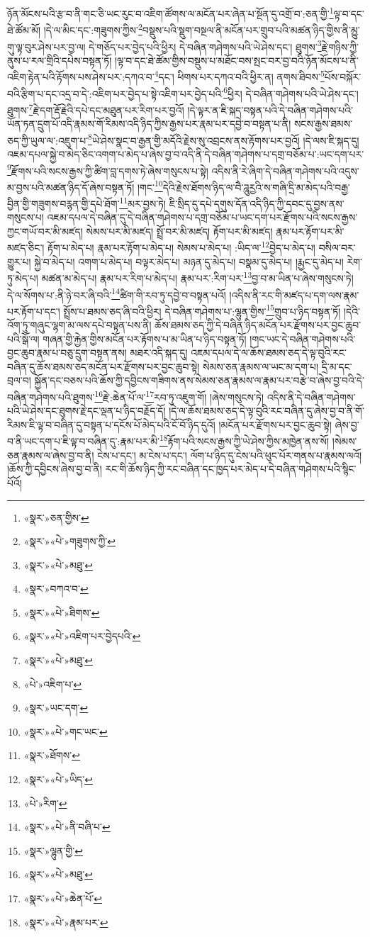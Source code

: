 ཉོན་མོངས་པའི་རྩ་བ་ནི་གང་ཅི་ཡང་རུང་བ་འཇིག་ཚོགས་ལ་མངོན་པར་ཞེན་པ་སྔོན་དུ་འགྲོ་བ་:ཅན་གྱི་\footnote{«སྣར་»ཅན་གྱིས་}ལྟ་བ་དང་ཐེ་ཚོམ་མོ། །དེ་ལ་མིང་དང་:གཟུགས་ཀྱིས་\footnote{«སྣར་»«པེ་»གཟུགས་ཀྱི་}བསྡུས་པའི་སྡུག་བསྔལ་ནི་མངོན་པར་གྲུབ་པའི་མཚན་ཉིད་གྱིས་ནི་མྱུ་གུ་ལྟ་བུར་ཤེས་པར་བྱ་ལ། དེ་གཅོད་པར་བྱེད་པའི་ཕྱིར། དེ་བཞིན་གཤེགས་པའི་ཡེ་ཤེས་དང་། ཐུགས་\footnote{«སྣར་»«པེ་»མཐུ་}རྗེ་གཉིས་ཀྱི་ནུས་པ་རལ་གྲིའི་དཔེས་བསྟན་ཏོ། །ལྟ་བ་དང་ཐེ་ཚོམ་གྱིས་བསྡུས་པ་མཐོང་བས་སྤང་བར་བྱ་བའི་ཉོན་མོངས་པ་ནི་འཇིག་རྟེན་པའི་རྟོགས་པས་ཤེས་པར་:དཀའ་བ་\footnote{«སྣར་»བཀའ་བ་}དང་། ཕིགས་པར་དཀའ་བའི་ཕྱིར་ན། ནགས་ཐིབས་\footnote{«སྣར་»«པེ་»ཐིགས་}པོས་བསྐོར་བའི་རྩིག་པ་དང་འདྲ་བ་དེ་:འཇིག་པར་བྱེད་པ་སྟེ་འཇིག་པར་བྱེད་པའི་\footnote{«སྣར་»«པེ་»འཇིག་པར་བྱེདཔའི་}ཕྱིར། དེ་བཞིན་གཤེགས་པའི་ཡེ་ཤེས་དང་། ཐུགས་\footnote{«སྣར་»«པེ་»མཐུ་}རྗེ་དག་རྡོ་རྗེའི་དཔེ་དང་མཐུན་པར་རིག་པར་བྱའོ། །དེ་ལྟར་ན་ཇི་སྐད་བསྟན་པའི་དེ་བཞིན་གཤེགས་པའི་ཡོན་ཏན་དྲུག་པོ་འདི་རྣམས་གོ་རིམས་འདི་ཉིད་ཀྱིས་རྒྱས་པར་རྣམ་པར་དབྱེ་བ་བསྟན་པ་ནི། སངས་རྒྱས་ཐམས་ཅད་ཀྱི་ཡུལ་ལ་:འཇུག་པ་\footnote{«པེ་»འཇིག་པ་}ཡེ་ཤེས་སྣང་བ་རྒྱན་གྱི་མདོའི་རྗེས་སུ་འབྲངས་ནས་རྟོགས་པར་བྱའོ། །དེ་ལས་ཇི་སྐད་དུ། འཇམ་དཔལ་སྐྱེ་བ་མེད་ཅིང་འགག་པ་མེད་པ་ཞེས་བྱ་བ་འདི་ནི་དེ་བཞིན་གཤེགས་པ་དགྲ་བཅོམ་པ་:ཡང་དག་པར་\footnote{«སྣར་»ཡང་དག་}རྫོགས་པའི་སངས་རྒྱས་ཀྱི་ཚིག་བླ་དགས་ཏེ་ཞེས་གསུངས་པ་སྟེ། འདིས་ནི་རེ་ཞིག་དེ་བཞིན་གཤེགས་པའི་འདུས་མ་བྱས་པའི་མཚན་ཉིད་དོ་ཞེས་བསྟན་ཏོ། །གང་\footnote{«སྣར་»«པེ་»གང་ཡང་}དེའི་རྗེས་ཐོགས་ཉིད་ལ་བཻ་ཌཱུརྱའི་ས་གཞི་དྲི་མ་མེད་པའི་བརྒྱ་བྱིན་གྱི་གཟུགས་བརྙན་གྱི་དཔེ་ཐོག་\footnote{«སྣར་»ཐོགས་}མར་བྱས་ཏེ། ཇི་སྲིད་དུ་དཔེ་དགུས་དོན་འདི་ཉིད་ཀྱི་དབང་དུ་བྱས་ནས་གསུངས་པ། འཇམ་དཔལ་དེ་བཞིན་དུ་དེ་བཞིན་གཤེགས་པ་དགྲ་བཅོམ་པ་ཡང་དག་པར་རྫོགས་པའི་སངས་རྒྱས་ཀྱང་གཡོ་བར་མི་མཛད། སེམས་པར་མི་མཛད། སྤྲོ་བར་མི་མཛད། རྟོག་པར་མི་མཛད། རྣམ་པར་རྟོག་པར་མི་མཛད་ཅིང་། རྟོག་པ་མེད་པ། རྣམ་པར་རྟོག་པ་མེད་པ། སེམས་པ་མེད་པ། :ཡིད་ལ་\footnote{«སྣར་»«པེ་»ཡིད་}བྱེད་པ་མེད་པ། བསིལ་བར་གྱུར་པ། སྐྱེ་བ་མེད་པ། འགག་པ་མེད་པ། བལྟར་མེད་པ། མཉན་དུ་མེད་པ། བསྣམ་དུ་མེད་པ། །རྨྱང་དུ་མེད་པ། རེག་ཏུ་མེད་པ། མཚན་མ་མེད་པ། རྣམ་པར་རིག་པ་མེད་པ། རྣམ་པར་:རིག་པར་\footnote{«པེ་»རིག་}བྱ་བ་མ་ཡིན་པ་ཞེས་གསུངས་ཏེ། དེ་ལ་སོགས་པ་:ནི་ཉེ་བར་ཞི་བའི་\footnote{«སྣར་»«པེ་»ནི་བཞི་པ་}ཚིག་གི་རབ་ཏུ་དབྱེ་བ་བསྟན་པའོ། །འདིས་ནི་རང་གི་མཛད་པ་དག་ལས་རྣམ་པར་རྟོག་པ་དང་། སྤྲོས་པ་ཐམས་ཅད་ཞི་བའི་ཕྱིར། དེ་བཞིན་གཤེགས་པ་:ལྷུན་གྱིས་\footnote{«སྣར་»ལྷུན་གྱི་}གྲུབ་པ་ཉིད་བསྟན་ཏོ། །དེའི་འོག་ཏུ་གཞུང་ལྷག་མ་ལས་དཔེ་བསྟན་པས་ནི། ཆོས་ཐམས་ཅད་ཀྱི་དེ་བཞིན་ཉིད་མངོན་པར་རྫོགས་པར་བྱང་ཆུབ་པའི་སྒོ་ལ། གཞན་གྱི་རྐྱེན་གྱིས་མངོན་པར་རྟོགས་པ་མ་ཡིན་པ་ཉིད་བསྟན་ཏོ། །གང་ཡང་དེ་བཞིན་གཤེགས་པའི་བྱང་ཆུབ་རྣམ་པ་བཅུ་དྲུག་བསྟན་ནས། མཐར་འདི་སྐད་དུ། འཇམ་དཔལ་དེ་ལ་ཆོས་ཐམས་ཅད་དེ་ལྟ་བུའི་རང་བཞིན་དུ་ཆོས་ཐམས་ཅད་མངོན་པར་རྫོགས་པར་བྱང་ཆུབ་སྟེ། སེམས་ཅན་རྣམས་ལ་ཡང་མ་དག་པ། དྲི་མ་དང་བྲལ་བ། སྐྱོན་དང་བཅས་པའི་ཆོས་ཀྱི་དབྱིངས་གཟིགས་ནས་སེམས་ཅན་རྣམས་ལ་རྣམ་པར་བརྩེ་བ་ཞེས་བྱ་བའི་དེ་བཞིན་གཤེགས་པའི་ཐུགས་\footnote{«སྣར་»«པེ་»མཐུ་}རྗེ་:ཆེན་པོ་ལ་\footnote{«སྣར་»«པེ་»ཆེན་པོ་}རབ་ཏུ་འཇུག་གོ། །ཞེས་གསུངས་ཏེ། འདིས་ནི་དེ་བཞིན་གཤེགས་པའི་ཡེ་ཤེས་དང་ཐུགས་རྗེ་དང་ལྡན་པ་ཉིད་བརྗོད་དོ། །དེ་ལ་ཆོས་ཐམས་ཅད་དེ་ལྟ་བུའི་རང་བཞིན་དུ་ཞེས་བྱ་བ་ནི་གོ་རིམས་ཇི་ལྟ་བ་བཞིན་དུ་བསྟན་པ་དངོས་པོ་མེད་པའི་ངོ་བོ་ཉིད་དུའོ། །མངོན་པར་རྫོགས་པར་བྱང་ཆུབ་སྟེ། ཞེས་བྱ་བ་ནི་ཡང་དག་པ་ཇི་ལྟ་བ་བཞིན་དུ་:རྣམ་པར་མི་\footnote{«སྣར་»«པེ་»རྣམ་པར་}རྟོག་པའི་སངས་རྒྱས་ཀྱི་ཡེ་ཤེས་ཀྱིས་མཁྱེན་ནས་སོ། །སེམས་ཅན་རྣམས་ལ་ཞེས་བྱ་བ་ནི། ངེས་པ་དང་། མ་ངེས་པ་དང་། ལོག་པ་ཉིད་དུ་ངེས་པའི་ཕུང་པོར་གནས་པ་རྣམས་ལའོ། །ཆོས་ཀྱི་དབྱིངས་ཞེས་བྱ་བ་ནི། རང་གི་ཆོས་ཉིད་ཀྱི་རང་བཞིན་དང་ཁྱད་པར་མེད་པ་དེ་བཞིན་གཤེགས་པའི་སྙིང་པོའོ། 